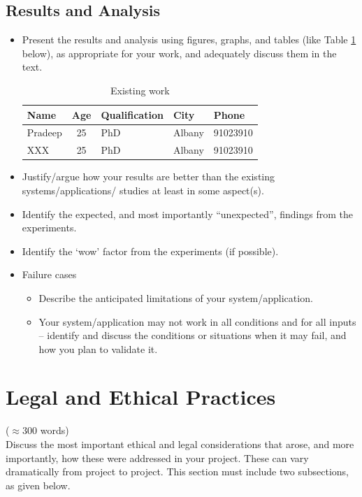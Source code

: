 \documentclass[12pt]{article}
\begin{document}
\subsection{Results and Analysis}\label{sec:results}
    \begin{itemize}
        \item Present the results and analysis using figures, graphs, and tables (like Table \ref{tab:relatedwork} below), as appropriate for your work, and adequately discuss them in the text.

\begin{table}[h]
\begin{center}
\caption{Existing work}\label{tab:relatedwork}
\begin{tabular}{|l|c|l|l|l|}
\hline
Name & Age & Qualification & City & Phone\\
\hline
Pradeep & 25 & PhD & Albany & 91023910\\
XXX  & 25 & PhD & Albany & 91023910\\
\hline
\end{tabular}
\end{center}
\end{table}
        \item Justify/argue how your results are better than the existing systems/applications/ studies at least in some aspect(s).
 \item	Identify the expected, and most importantly “unexpected”, findings from the experiments.
 \item	Identify the `wow' factor from the experiments (if possible).
 \item	Failure cases
    \begin{itemize}
        \item Describe the anticipated limitations of your system/application.
        \item Your system/application may not work in all conditions and for all inputs – identify and discuss the conditions or situations when it may fail, and how you plan to validate it.
    \end{itemize}
\end{itemize}



\section{Legal and Ethical Practices}\label{chap:ethics}
($\approx$300 words)\\
Discuss the most important ethical and legal considerations that arose, and more importantly, how these were addressed in your project. These can vary dramatically from project to project. This section must include two subsections, as given below.
\end{document}
